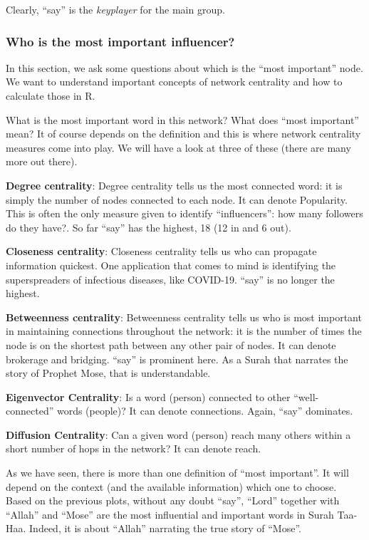 \documentclass[
]{article}
\begin{document}
Clearly, ``say'' is the \emph{keyplayer} for the main group.

\hypertarget{who-is-the-most-important-influencer}{%
\subsubsection{Who is the most important influencer?}\label{who-is-the-most-important-influencer}}

In this section, we ask some questions about which is the ``most important'' node. We want to understand important concepts of network centrality and how to calculate those in R.

What is the most important word in this network? What does ``most important'' mean? It of course depends on the definition and this is where network centrality measures come into play. We will have a look at three of these (there are many more out there).

\textbf{Degree centrality}: Degree centrality tells us the most connected word: it is simply the number of nodes connected to each node. It can denote Popularity. This is often the only measure given to identify ``influencers'': how many followers do they have?. So far ``say'' has the highest, 18 (12 in and 6 out).

\textbf{Closeness centrality}: Closeness centrality tells us who can propagate information quickest. One application that comes to mind is identifying the superspreaders of infectious diseases, like COVID-19. ``say'' is no longer the highest.

\textbf{Betweenness centrality}: Betweenness centrality tells us who is most important in maintaining connections throughout the network: it is the number of times the node is on the shortest path between any other pair of nodes. It can denote brokerage and bridging. ``say'' is prominent here. As a Surah that narrates the story of Prophet Mose, that is understandable.

\textbf{Eigenvector Centrality}: Is a word (person) connected to other ``well-connected'' words (people)? It can denote connections. Again, ``say'' dominates.

\textbf{Diffusion Centrality}: Can a given word (person) reach many others within a short number of hops in the network? It can denote reach.

As we have seen, there is more than one definition of ``most important''. It will depend on the context (and the available information) which one to choose. Based on the previous plots, without any doubt ``say'', ``Lord'' together with ``Allah'' and ``Mose'' are the most influential and important words in Surah Taa-Haa. Indeed, it is about ``Allah'' narrating the true story of ``Mose''.
\end{document}

